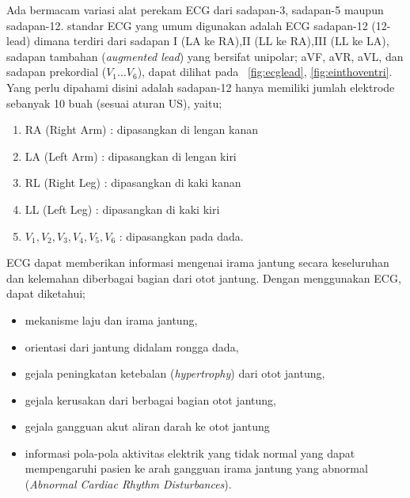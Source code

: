 
Ada bermacam variasi alat perekam ECG dari sadapan-3, sadapan-5 maupun
sadapan-12. standar ECG yang umum digunakan adalah ECG sadapan-12 (12-lead)
dimana terdiri dari sadapan I (LA ke RA),II (LL ke RA),III (LL ke LA), sadapan
tambahan (\textit{augmented lead}) yang bersifat unipolar; aVF, aVR, aVL, dan 
sadapan prekordial ($V_1 \dots V_6$), dapat dilihat pada \pic~\ref{fig:ecglead},
\ref{fig:einthoventri}. Yang perlu dipahami disini adalah sadapan-12 hanya
memiliki jumlah elektrode sebanyak 10 buah (sesuai aturan US), yaitu;
\begin{enumerate}
    \item RA (Right Arm) : dipasangkan di lengan kanan
	\item LA (Left Arm)  : dipasangkan di lengan kiri
	\item RL (Right Leg) : dipasangkan di kaki kanan
	\item LL (Left Leg)  : dipasangkan di kaki kiri
	\item $V_1,V_2,V_3,V_4,V_5,V_6$ : dipasangkan pada dada. 
\end{enumerate}

ECG dapat memberikan informasi mengenai irama jantung  secara keseluruhan dan
kelemahan diberbagai bagian dari otot jantung. Dengan menggunakan ECG, dapat
diketahui;

\begin{itemize}
   \item mekanisme laju dan irama jantung, 
   \item orientasi dari jantung didalam rongga dada, 
   \item gejala peningkatan ketebalan (\textit{hypertrophy}) dari otot jantung,
   \item gejala kerusakan dari berbagai bagian otot jantung, 
   \item gejala gangguan akut aliran darah ke otot jantung
   \item informasi pola-pola aktivitas elektrik yang tidak normal yang dapat
   mempengaruhi pasien ke arah gangguan irama jantung yang abnormal
   (\textit{Abnormal Cardiac Rhythm Disturbances}).
\end{itemize}

